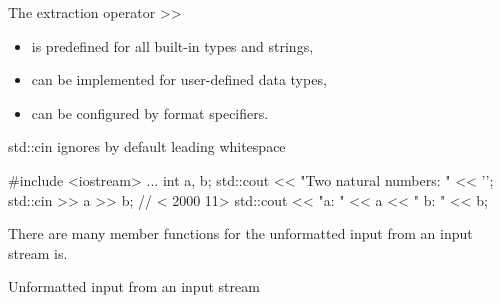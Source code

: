 
The extraction operator >{}>

\begin{itemize}
\item 
is predefined for all built-in types and strings,

\item 
can be implemented for user-defined data types,

\item 
can be configured by format specifiers.
\end{itemize}

\begin{myTip}{std::cin ignores by default leading whitespace}
\begin{cpp}
#include <iostream>
...
int a, b;
std::cout << "Two natural numbers: " << '\n';
std::cin >> a >> b; // < 2000 11>
std::cout << "a: " << a << " b: " << b;
\end{cpp}
\end{myTip}


There are many member functions for the unformatted input from an input stream is.

\begin{center}
Unformatted input from an input stream
\end{center}

